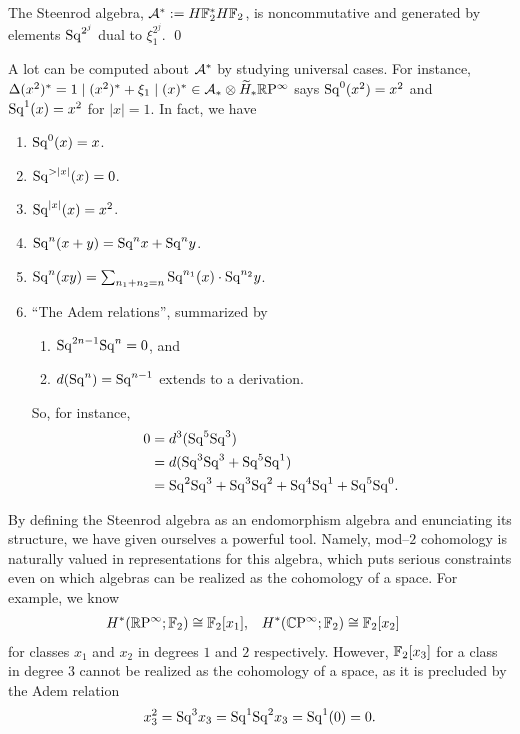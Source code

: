 \begin{corollary}
The Steenrod algebra, $\mathcal A^* := H\mathbb F_2^* H\mathbb F_2$, is noncommutative and generated by elements $\mathrm{Sq}^{2^j}$ dual to $\xi_1^{2^j}$.
\qed
\end{corollary}

\begin{remark}
A lot can be computed about $\mathcal A^*$ by studying universal cases.
For instance, $\Delta(x^2)^* = 1 \mid (x^2)^* + \xi_1 \mid (x)^* \in \mathcal A_* \otimes \widetilde H_* \mathbb R \mathrm{P}^\infty$ says $\mathrm{Sq}^0(x^2) = x^2$ and $\mathrm{Sq}^1(x) = x^2$ for $|x| = 1$.
In fact, we have
\begin{enumerate}
    \item $\mathrm{Sq}^0(x) = x$.
    \item $\mathrm{Sq}^{>|x|}(x) = 0$.
    \item $\mathrm{Sq}^{|x|}(x) = x^2$.
    \item $\mathrm{Sq}^n(x+y) = \mathrm{Sq}^n x + \mathrm{Sq}^n y$.
    \item $\mathrm{Sq}^n(xy) = \sum_{n_1 + n_2 = n} \mathrm{Sq}^{n_1}(x) \cdot \mathrm{Sq}^{n_2} y$.
    \item ``The Adem relations'', summarized by
    \begin{enumerate}
        \item $\mathrm{Sq}^{2n-1} \mathrm{Sq}^n = 0$, and
        \item $d(\mathrm{Sq}^n) = \mathrm{Sq}^{n-1}$ extends to a derivation.
    \end{enumerate}
    So, for instance,
    \begin{align*}
    0 & = d^3(\mathrm{Sq}^5 \mathrm{Sq}^3) \\
    & = d(\mathrm{Sq}^3\mathrm{Sq}^3 + \mathrm{Sq}^5 \mathrm{Sq}^1) \\
    & = \mathrm{Sq}^2 \mathrm{Sq}^3 + \mathrm{Sq}^3 \mathrm{Sq}^2 + \mathrm{Sq}^4 \mathrm{Sq}^1 + \mathrm{Sq}^5 \mathrm{Sq}^0.
    \end{align*}
\end{enumerate}
\end{remark}

\begin{remark}
By defining the Steenrod algebra as an endomorphism algebra and enunciating its structure, we have given ourselves a powerful tool.
Namely, mod--$2$ cohomology is naturally valued in representations for this algebra, which puts serious constraints even on which algebras can be realized as the cohomology of a space.
For example, we know
\begin{align*}
H^*(\mathbb R \mathrm{P}^\infty; \mathbb F_2) & \cong \mathbb F_2[x_1], &
H^*(\mathbb C \mathrm{P}^\infty; \mathbb F_2) & \cong \mathbb F_2[x_2]
\end{align*}
for classes $x_1$ and $x_2$ in degrees $1$ and $2$ respectively.
However, $\mathbb F_2[x_3]$ for a class in degree $3$ cannot be realized as the cohomology of a space, as it is precluded by the Adem relation \[x_3^2 = \mathrm{Sq}^3 x_3 = \mathrm{Sq}^1 \mathrm{Sq}^2 x_3 = \mathrm{Sq}^1(0) = 0.\]
\end{remark}




